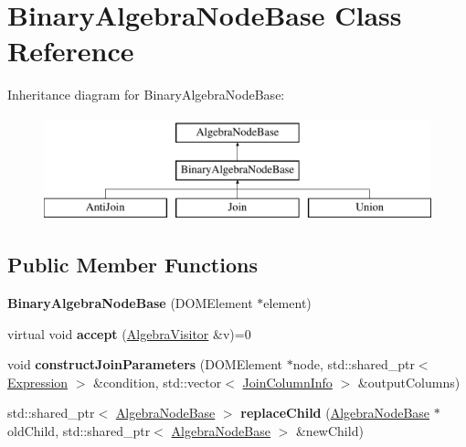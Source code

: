 \hypertarget{class_binary_algebra_node_base}{\section{Binary\+Algebra\+Node\+Base Class Reference}
\label{class_binary_algebra_node_base}
}
Inheritance diagram for Binary\+Algebra\+Node\+Base\+:\begin{figure}[H]
\begin{center}
\leavevmode
\includegraphics[height=3.000000cm]{class_binary_algebra_node_base}
\end{center}
\end{figure}
\subsection*{Public Member Functions}
\begin{DoxyCompactItemize}
\item 
\hypertarget{class_binary_algebra_node_base_a0a44a290bb4c433b83f58d948240a0d0}{{\bfseries Binary\+Algebra\+Node\+Base} (D\+O\+M\+Element $\ast$element)}\label{class_binary_algebra_node_base_a0a44a290bb4c433b83f58d948240a0d0}

\item 
\hypertarget{class_binary_algebra_node_base_ab6521a638b418e4f0939270bab77b901}{virtual void {\bfseries accept} (\hyperlink{class_algebra_visitor}{Algebra\+Visitor} \&v)=0}\label{class_binary_algebra_node_base_ab6521a638b418e4f0939270bab77b901}

\item 
\hypertarget{class_binary_algebra_node_base_a266f8e4526337e86f97ebeabb326be22}{void {\bfseries construct\+Join\+Parameters} (D\+O\+M\+Element $\ast$node, std\+::shared\+\_\+ptr$<$ \hyperlink{class_expression}{Expression} $>$ \&condition, std\+::vector$<$ \hyperlink{class_join_column_info}{Join\+Column\+Info} $>$ \&output\+Columns)}\label{class_binary_algebra_node_base_a266f8e4526337e86f97ebeabb326be22}

\item 
\hypertarget{class_binary_algebra_node_base_a6e466b62966a9851c3c34e1fb588a496}{std\+::shared\+\_\+ptr$<$ \hyperlink{class_algebra_node_base}{Algebra\+Node\+Base} $>$ {\bfseries replace\+Child} (\hyperlink{class_algebra_node_base}{Algebra\+Node\+Base} $\ast$old\+Child, std\+::shared\+\_\+ptr$<$ \hyperlink{class_algebra_node_base}{Algebra\+Node\+Base} $>$ \&new\+Child)}\label{class_binary_algebra_node_base_a6e466b62966a9851c3c34e1fb588a496}

\end{DoxyCompactItemize}
